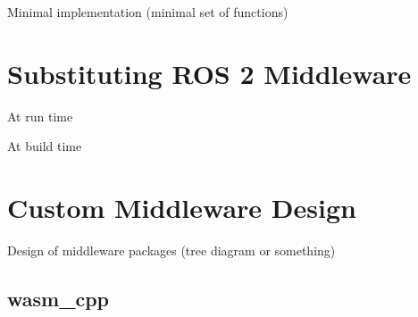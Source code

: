     Minimal implementation (minimal set of functions)

    
\section{Substituting ROS 2 Middleware}

    At run time

    At build time

\section{Custom Middleware Design}

    Design of middleware packages (tree diagram or something)

    \subsection{\textsf{wasm\_cpp}}


